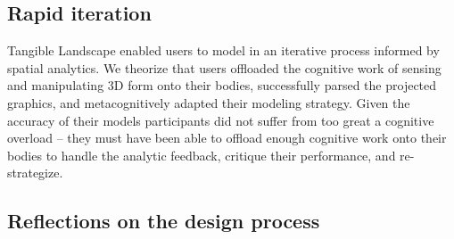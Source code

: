 \documentclass[prodmode,acmtochi]{acmsmall} %
\begin{document}
\subsection{Rapid iteration} %
Tangible Landscape enabled users 
to model in an iterative process informed by spatial analytics. %
%
We theorize that users offloaded the cognitive work 
of sensing and manipulating 3D form onto their bodies,
successfully parsed the projected graphics,
and metacognitively adapted their modeling strategy.
%
Given the accuracy of their models 
participants did not suffer from too great a cognitive overload 
-- they must have been able to offload enough cognitive work onto their bodies
to handle the analytic feedback, critique their performance, and re-strategize.











\subsection{Reflections on the design process} %

% 
%

\end{document}
